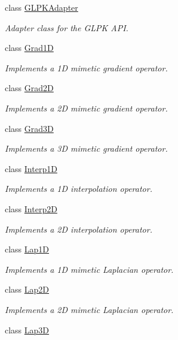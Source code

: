 \begin{DoxyCompactItemize}
class \hyperlink{classmtk_1_1GLPKAdapter}{G\+L\+P\+K\+Adapter}
\begin{DoxyCompactList}\small\item\em Adapter class for the G\+L\+P\+K A\+P\+I. \end{DoxyCompactList}\item 
class \hyperlink{classmtk_1_1Grad1D}{Grad1\+D}
\begin{DoxyCompactList}\small\item\em Implements a 1\+D mimetic gradient operator. \end{DoxyCompactList}\item 
class \hyperlink{classmtk_1_1Grad2D}{Grad2\+D}
\begin{DoxyCompactList}\small\item\em Implements a 2\+D mimetic gradient operator. \end{DoxyCompactList}\item 
class \hyperlink{classmtk_1_1Grad3D}{Grad3\+D}
\begin{DoxyCompactList}\small\item\em Implements a 3\+D mimetic gradient operator. \end{DoxyCompactList}\item 
class \hyperlink{classmtk_1_1Interp1D}{Interp1\+D}
\begin{DoxyCompactList}\small\item\em Implements a 1\+D interpolation operator. \end{DoxyCompactList}\item 
class \hyperlink{classmtk_1_1Interp2D}{Interp2\+D}
\begin{DoxyCompactList}\small\item\em Implements a 2\+D interpolation operator. \end{DoxyCompactList}\item 
class \hyperlink{classmtk_1_1Lap1D}{Lap1\+D}
\begin{DoxyCompactList}\small\item\em Implements a 1\+D mimetic Laplacian operator. \end{DoxyCompactList}\item 
class \hyperlink{classmtk_1_1Lap2D}{Lap2\+D}
\begin{DoxyCompactList}\small\item\em Implements a 2\+D mimetic Laplacian operator. \end{DoxyCompactList}\item 
class \hyperlink{classmtk_1_1Lap3D}{Lap3\+D}

\end{DoxyCompactItemize}
